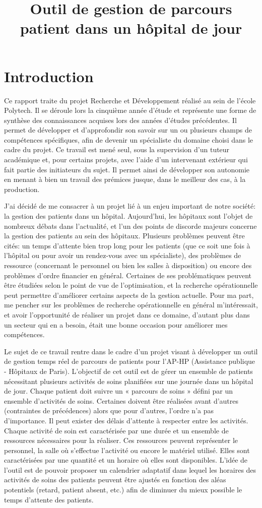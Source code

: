 \documentclass{polytech/polytech}
\title{Outil de gestion de parcours patient dans un hôpital de jour}
\begin{document}
\chapter*{Introduction}

Ce rapport traite du projet Recherche et Développement réalisé au sein de l'école Polytech. Il se déroule lors la cinquième année d'étude et représente une forme de synthèse des connaissances acquises lors des années d’études précédentes. Il permet de développer et d’approfondir son savoir sur un ou plusieurs champs de compétences spécifiques, afin de devenir un spécialiste du domaine choisi dans le cadre du projet. Ce travail est mené seul, sous la supervision d'un tuteur académique et, pour certains projets, avec l’aide d’un intervenant extérieur qui fait partie des initiateurs du sujet. Il permet ainsi de développer son autonomie en menant à bien un travail des prémices jusque, dans le meilleur des cas, à la production.

J'ai décidé de me consacrer à un projet lié à un enjeu important de notre société: la gestion des patients dans un hôpital. Aujourd'hui, les hôpitaux sont l'objet de nombreux débats dans l'actualité, et l'un des points de discorde majeurs concerne la gestion des patients au sein des hôpitaux. Plusieurs problèmes peuvent être cités: un temps d'attente bien trop long pour les patients (que ce soit une fois à l'hôpital ou pour avoir un rendez-vous avec un spécialiste), des problèmes de ressource (concernant le personnel ou bien les salles à disposition) ou encore des problèmes d'ordre financier en général. Certaines de ses problématiques peuvent être étudiées selon le point de vue de l'optimisation, et la recherche opérationnelle peut permettre d'améliorer certains aspects de la gestion actuelle. Pour ma part, me pencher sur les problèmes de recherche opérationnelle en général m'intéressait, et avoir l'opportunité de réaliser un projet dans ce domaine, d'autant plus dans un secteur qui en a besoin, était une bonne occasion pour améliorer mes compétences.

Le sujet de ce travail rentre dans le cadre d’un projet visant à développer un outil de gestion temps réel de parcours de patients pour l’AP-HP (Assistance publique - Hôpitaux de Paris). L'objectif de cet outil est de gérer un ensemble de patients nécessitant plusieurs activités de soins planifiées sur une journée dans un hôpital de jour. Chaque patient doit suivre un « parcours de soins » défini par un ensemble d’activités de soins. Certaines doivent être réalisées avant d'autres (contraintes de précédences) alors que pour d'autres, l’ordre n’a pas d’importance. Il peut exister des délais d'attente à respecter entre les activités. Chaque activité de soin est caractérisée par une durée et un ensemble de ressources nécessaires pour la réaliser. Ces ressources peuvent représenter le personnel, la salle où s'effectue l'activité ou encore le matériel utilisé. Elles sont caractérisées par une quantité et un horaire où elles sont disponibles. L'idée de l'outil est de pouvoir proposer un calendrier adaptatif dans lequel les horaires des activités de soins des patients peuvent être ajustés en fonction des aléas potentiels (retard, patient absent, etc.) afin de diminuer du mieux possible le temps d'attente des patients.
\end{document}
